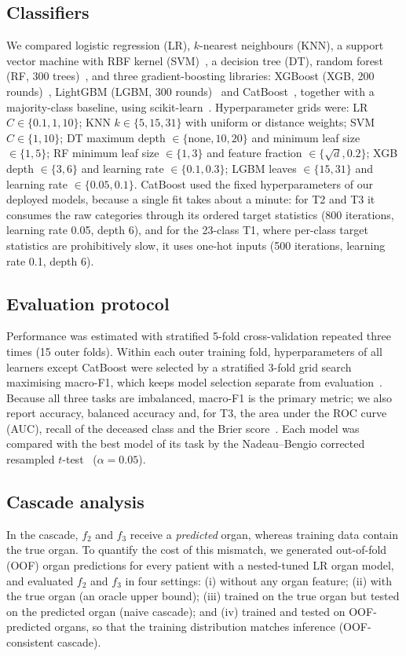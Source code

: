 \documentclass[conference]{IEEEtran}
\begin{document}
\subsection{Classifiers}
We compared logistic regression (LR), $k$-nearest neighbours (KNN), a support vector machine with RBF kernel (SVM)~\cite{cortes1995}, a decision tree (DT), random forest (RF, 300 trees)~\cite{breiman2001}, and three gradient-boosting libraries: XGBoost (XGB, 200 rounds)~\cite{chen2016}, LightGBM (LGBM, 300 rounds)~\cite{ke2017} and CatBoost~\cite{prokhorenkova2018}, together with a majority-class baseline, using scikit-learn~\cite{pedregosa2011}. Hyperparameter grids were: LR $C\in\{0.1,1,10\}$; KNN $k\in\{5,15,31\}$ with uniform or distance weights; SVM $C\in\{1,10\}$; DT maximum depth $\in\{\text{none},10,20\}$ and minimum leaf size $\in\{1,5\}$; RF minimum leaf size $\in\{1,3\}$ and feature fraction $\in\{\sqrt{d},0.2\}$; XGB depth $\in\{3,6\}$ and learning rate $\in\{0.1,0.3\}$; LGBM leaves $\in\{15,31\}$ and learning rate $\in\{0.05,0.1\}$. CatBoost used the fixed hyperparameters of our deployed models, because a single fit takes about a minute: for T2 and T3 it consumes the raw categories through its ordered target statistics (800 iterations, learning rate 0.05, depth 6), and for the 23-class T1, where per-class target statistics are prohibitively slow, it uses one-hot inputs (500 iterations, learning rate 0.1, depth 6).

\subsection{Evaluation protocol}
Performance was estimated with stratified 5-fold cross-validation repeated three times (15 outer folds). Within each outer training fold, hyperparameters of all learners except CatBoost were selected by a stratified 3-fold grid search maximising macro-F1, which keeps model selection separate from evaluation~\cite{cawley2010}. Because all three tasks are imbalanced, macro-F1 is the primary metric; we also report accuracy, balanced accuracy and, for T3, the area under the ROC curve (AUC), recall of the deceased class and the Brier score~\cite{brier1950}. Each model was compared with the best model of its task by the Nadeau--Bengio corrected resampled $t$-test~\cite{nadeau2003} ($\alpha=0.05$).

\subsection{Cascade analysis}
In the cascade, $f_2$ and $f_3$ receive a \emph{predicted} organ, whereas training data contain the true organ. To quantify the cost of this mismatch, we generated out-of-fold (OOF) organ predictions for every patient with a nested-tuned LR organ model, and evaluated $f_2$ and $f_3$ in four settings: (i) without any organ feature; (ii) with the true organ (an oracle upper bound); (iii) trained on the true organ but tested on the predicted organ (naive cascade); and (iv) trained and tested on OOF-predicted organs, so that the training distribution matches inference (OOF-consistent cascade).
\end{document}
